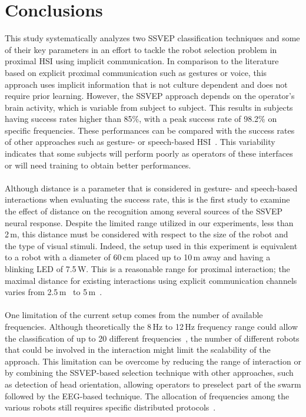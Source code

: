 \documentclass[smallextended]{svjour3}
\begin{document}
\section{Conclusions}
This study systematically analyzes two SSVEP classification techniques and some of their key parameters in an effort to tackle the robot selection problem in proximal HSI using implicit communication. 
In comparison to the literature based on explicit proximal communication such as gestures or voice, this approach uses implicit information that is not culture dependent and does not require prior learning. 
However, the SSVEP approach depends on the operator's brain activity, which is variable from subject to subject. This results in subjects having success rates higher than 85\%, with a peak success rate of 98.2\% on specific frequencies. These performances can be compared with the success rates of other approaches such as gesture- or speech-based HSI~\cite{Nagietal2014,Pourmehr2013}. This variability indicates that some subjects will perform poorly as operators of these interfaces or will need training to obtain better performances.\\
\\
Although distance is a parameter that is considered in gesture- and speech-based interactions when evaluating the success rate, this is the first study to examine the effect of distance on the recognition among several sources of the SSVEP neural response.
Despite the limited range utilized in our experiments, less than 2\,m, this distance must be considered with respect to the size of the robot and the type of visual stimuli. 
Indeed, the setup used in this experiment is equivalent to a robot with a diameter of 60\,cm placed up to 10\,m away and having a blinking LED of 7.5\,W. This is a reasonable range for proximal interaction; the maximal distance for existing interactions using explicit communication channels varies from 2.5\,m~\cite{Pourmehr2013} to 5\,m~\cite{Nagietal2014}.\\
\\
One limitation of the current setup comes from the number of available frequencies.
Although theoretically the 8\,Hz to 12\,Hz frequency range could allow the classification of up to 20 different frequencies~\cite{SSVEPfiability}, the number of different robots that could be involved in the interaction might limit the scalability of the approach. This limitation can be overcome by reducing the range of interaction or by combining the SSVEP-based selection technique with other approaches, such as detection of head orientation, allowing operators to preselect part of the swarm followed by the EEG-based technique. The allocation of frequencies among the various robots still requires specific distributed protocols~\cite{mathews2015spatially}.\\
\end{document}
